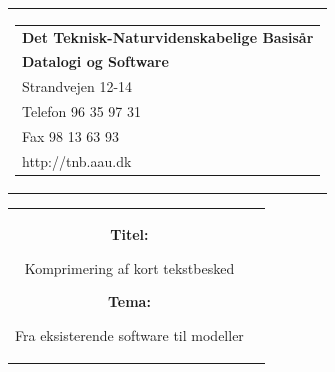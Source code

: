 \begin{titlepage}
\small
\begin{nopagebreak}
{\samepage 
\begin{tabular}{r}
\parbox{\textwidth}{  
\hfill \parbox{4.9cm}{\begin{tabular}{l}
{\sf\small \textbf{Det Teknisk-Naturvidenskabelige Basis{\aa}r }}\\
{\sf\small  \textbf{Datalogi og Software}} \\
{\sf\small Strandvejen 12-14} \\
{\sf\small Telefon 96 35 97 31} \\
{\sf\small Fax 98 13 63 93} \\
{\sf\small http://tnb.aau.dk}
\end{tabular}}}
\\
\end{tabular}

\begin{tabular}{cc}
\parbox{7cm}{
\begin{description}

\item {\bf Titel:} 

Komprimering af kort tekstbesked
  
\item {\bf Tema:} 

Fra eksisterende software til modeller

\end{description}

\parbox{8cm}{

}}
\end{tabular}}
\end{nopagebreak}
\end{titlepage}

